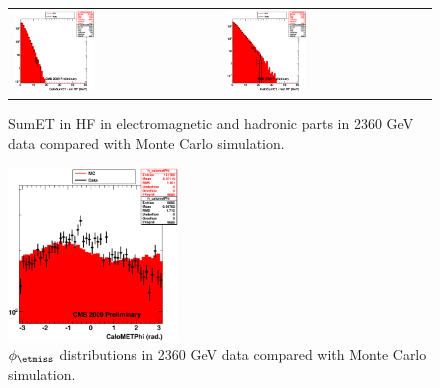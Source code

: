 \begin{figure}[h!]
 \centering
 \begin{tabular}{ll}
  \includegraphics[width=0.40\textwidth]{plots_DataVsMC_MB_2360GeV/h_caloSumetEmHF.eps} &
  \includegraphics[width=0.40\textwidth]{plots_DataVsMC_MB_2360GeV/h_caloSumetHadHF.eps} \\
 \end{tabular}
 \caption{SumET in HF in electromagnetic and hadronic parts in 2360 GeV data compared
   with Monte Carlo simulation.
          \label{fig:DataVsMC_MB_2360_6}}

\end{figure}
\begin{figure}[h!]
 \centering
  \includegraphics[width=0.40\textwidth]{plots_DataVsMC_MB_2360GeV/h_calometPhi.eps}
 \caption{$\phi_{\etmiss}$ distributions in 2360 GeV data compared
   with Monte Carlo simulation.
          \label{fig:DataVsMC_MB_2360_7}}
\end{figure}

